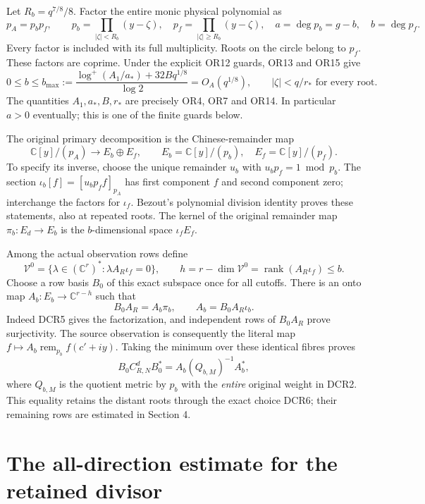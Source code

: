 \documentclass[11pt]{article}
\newcommand{\C}{\mathbb C}\newcommand{\Pp}{\mathcal P}
\newcommand{\lp}{\log^+}
\begin{document}
Let \(R_b=q^{7/8}/8\). Factor the entire monic physical polynomial as
\[
p_A=p_b p_f,\qquad
p_b=\prod_{|\zeta|<R_b}(y-\zeta),\quad
p_f=\prod_{|\zeta|\ge R_b}(y-\zeta),\quad
a=\deg p_b=g-b,\quad b=\deg p_f.
\tag{DCR3}
\]
Every factor is included with its full multiplicity. Roots on the
circle belong to \(p_f\). These factors are coprime. Under the explicit
OR12 guards, OR13 and OR15 give
\[
0\le b\le b_{\max}:=
 \frac{\lp(A_1/a_*)+32Bq^{1/8}}{\log2}=O_A(q^{1/8}),
\qquad |\zeta|<q/r_* \text{ for every root}.
\tag{DCR4}
\]
The quantities \(A_1,a_*,B,r_*\) are precisely OR4, OR7 and OR14.
In particular \(a>0\) eventually; this is one of the finite guards below.

The original primary decomposition is the Chinese-remainder map
\[
\C[y]/(p_A)\longrightarrow E_b\oplus E_f,\qquad
E_b=\C[y]/(p_b),\quad E_f=\C[y]/(p_f).
\tag{DCR5}
\]
To specify its inverse, choose the unique remainder \(u_b\) with
\(u_b p_f=1\bmod p_b\). The section
\(\iota_b[f]=[u_b p_f f]_{p_A}\) has first component \(f\)
and second component zero; interchange the factors for \(\iota_f\).
Bezout's polynomial division identity proves these statements,
also at repeated roots. The kernel of the original remainder map
\(\pi_b:E_d\to E_b\) is the \(b\)-dimensional space \(\iota_f E_f\).

Among the actual observation rows define
\[
\mathcal V^0=\{\lambda\in(\C^r)^*:
          \lambda A_R\iota_f=0\},\qquad
h=r-\dim\mathcal V^0=\operatorname{rank}(A_R\iota_f)\le b.
\tag{DCR6}
\]
Choose a row basis \(B_0\) of this exact subspace once for all cutoffs.
There is an onto map \(A_b:E_b\to\C^{r-h}\) such that
\[
 B_0A_R=A_b\pi_b,\qquad A_b=B_0A_R\iota_b.
\tag{DCR7}
\]
Indeed DCR5 gives the factorization, and independent rows of \(B_0A_R\)
prove surjectivity. The source observation is consequently the
literal map \(f\mapsto A_b\operatorname{rem}_{p_b}f(c'+iy)\).
Taking the minimum over these identical fibres proves
\[
B_0C_{R,N}^dB_0^*=A_b(Q_{b,M})^{-1}A_b^*,
\tag{DCR8}
\]
where \(Q_{b,M}\) is the quotient metric by \(p_b\) with the
\emph{entire} original weight in DCR2. This equality retains the
distant roots through the exact choice DCR6; their remaining rows
are estimated in Section 4.

\section{The all-direction estimate for the retained divisor}
\end{document}
